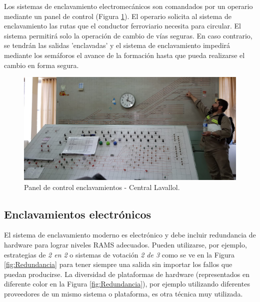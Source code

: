 			
			Los sistemas de enclavamiento electromecánicos son comandados por un operario mediante un panel de control (Figura \ref{fig:Electromecanico}). El operario solicita al sistema de enclavamiento las rutas que el conductor ferroviario necesita para circular. El sistema permitirá solo la operación de cambio de vías seguras. En caso contrario, se tendrán las salidas 'enclavadas' y el sistema de enclavamiento impedirá mediante los semáforos el avance de la formación hasta que pueda realizarse el cambio en forma segura.
		
			\begin{figure}[h!]
				\centering
				\includegraphics[scale=.27]{./Figures/Electromecanico}
				\caption{Panel de control enclavamientos - Central Lavallol.}
				\label{fig:Electromecanico}
			\end{figure}
		
			\vspace{5cm}
			
		
		\subsection{Enclavamientos electrónicos}
		\label{sec:Redundancia}	
			
			El sistema de enclavamiento moderno es electrónico y debe incluir redundancia de hardware para lograr niveles RAMS adecuados. Pueden utilizarse, por ejemplo, estrategias de \emph{2 en 2} o sistemas de votación \emph{2 de 3}  como se ve en la Figura \ref{fig:Redundancia} para tener siempre una salida sin importar los fallos que puedan producirse\citep{REDUNDANCIA}. La diversidad de plataformas de hardware (representados en diferente color en la Figura \ref{fig:Redundancia}), por ejemplo utilizando diferentes proveedores de un mismo sistema o plataforma, es otra técnica muy utilizada.
			
